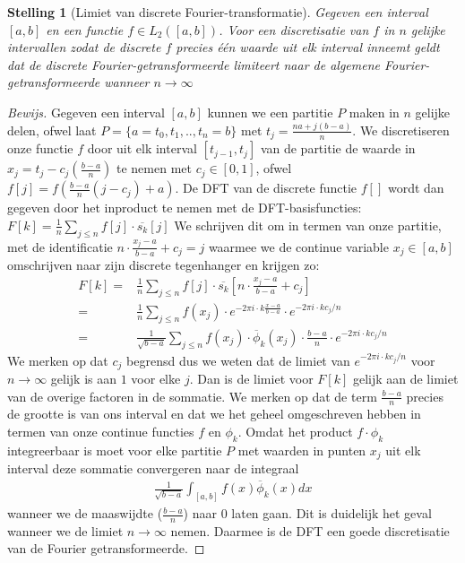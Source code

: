 \documentclass[11pt]{report}
\newtheorem*{stelling}{Stelling}
\theoremstyle{remark}
\newcommand{\eq}[1]{\begin{eqnarray*} #1 \end{eqnarray*}}
\newcommand{\dpii}{{2\pi i}}
\begin{document}
\begin{stelling}[Limiet van discrete Fourier-transformatie]
  Gegeven een interval $[a,b]$ en een functie $f\in L_2([a,b])$. 
  Voor een discretisatie van $f$ in $n$ gelijke
  intervallen zodat de discrete $f$ precies \'e\'en waarde uit elk interval inneemt geldt dat de discrete
  Fourier-getransformeerde limiteert naar de algemene Fourier-getransformeerde wanneer $n\to\infty$
\end{stelling} 
\begin{proof}[Bewijs]
Gegeven een interval $[a,b]$ kunnen we een partitie $P$ maken in $n$ gelijke delen, ofwel laat $P=\{a=t_0,t_1,..,t_n=b\}$ met $t_j = \tfrac{na + j(b-a)}{n}$.
We discretiseren onze functie $f$ door uit elk interval $[t_{j-1},t_{j}]$ van de partitie de waarde in $x_j = t_j - c_j(\tfrac{b-a}{n})$ te nemen met $c_j \in [0,1]$, ofwel
$f[j] = f(\frac{b-a}{n}(j-c_j) + a)$.
De DFT van de discrete functie $f[]$ wordt dan gegeven door het inproduct te nemen met de DFT-basisfuncties:
$F[k] = \frac1n\sum_{j\leq n} f[j] \cdot \overline{s_k}[j]$
We schrijven dit om in termen van onze partitie, met de identificatie $n\cdot\tfrac{x_j-a}{b-a} + c_j= j$ 
waarmee we de continue variable $x_j\in[a,b]$ omschrijven naar zijn discrete tegenhanger en krijgen zo:
\eq{
  F[k] =& \frac{1}{n} \sum_{j \leq n} f[j]\cdot \overline{s_k}[n\cdot\tfrac{x_j-a}{b-a} + c_j] \\
       =& \frac{1}{n} \sum_{j \leq n} f(x_j)\cdot 
       e^{-\dpii \cdot k \tfrac{x-a}{b-a}} \cdot e^{-\dpii \cdot k c_j/n} \\
       =&  \frac{1}{\sqrt{b-a}}\sum_{j \leq n} f(x_j)\cdot \overline{\phi}_k(x_j) \cdot\frac{b-a}{n} 
\cdot e^{-\dpii \cdot k c_j/n}
}
We merken op dat $c_j$ begrensd dus we weten dat de limiet van 
$e^{-\dpii\cdot k c_j/n}$ voor $n\to\infty$ gelijk is aan $1$ voor elke $j$. 
Dan is de limiet voor $F[k]$ gelijk aan de limiet van de overige factoren in de sommatie.
We merken op dat de term $\frac{b-a}{n}$ precies de grootte is van ons interval en dat we het geheel
omgeschreven hebben in termen van onze continue functies $f$ en $\phi_k$.
Omdat het product $f\cdot\phi_k$ integreerbaar is moet voor elke partitie $P$ met 
waarden in punten $x_j$ uit elk interval deze sommatie convergeren naar de integraal
\eq{
  \frac{1}{\sqrt{b-a}} \int_{[a,b]} f(x) \overline{\phi}_k(x) dx
}
wanneer we de maaswijdte ($\tfrac{b-a}{n}$) naar $0$ laten gaan. Dit is duidelijk het geval wanneer we de limiet $n\to\infty$ nemen. Daarmee is de DFT een goede discretisatie van de Fourier getransformeerde. 
\end{proof}
 
\end{document}
